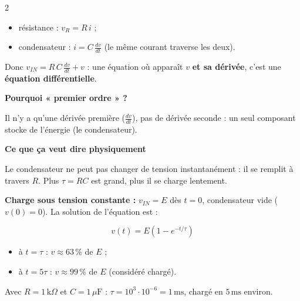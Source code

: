 \documentclass[a4paper,9pt]{extarticle}
\begin{document}
\begin{multicols}{2}
\begin{important}
\begin{itemize}

\item résistance : $v_R = R\,i$ ;

\item condensateur : $i = C\,\frac{dv}{dt}$ (le même courant traverse les deux).

\end{itemize}

Donc $v_{IN} = R\,C\,\frac{dv}{dt} + v$ : une équation où apparaît $v$ \textbf{et sa dérivée}, c'est une \textbf{équation différentielle}.

\vspace{3pt}

\textbf{Pourquoi « premier ordre » ?}

Il n'y a qu'une dérivée première ($\frac{dv}{dt}$), pas de dérivée seconde : un seul composant stocke de l'énergie (le condensateur).

\vspace{3pt}

\textbf{Ce que ça veut dire physiquement}

Le condensateur ne peut pas changer de tension instantanément : il se remplit à travers $R$. Plus $\tau = RC$ est grand, plus il se charge lentement.

\end{important}


\begin{example}

\textbf{Charge sous tension constante :} $v_{IN} = E$ dès $t = 0$, condensateur vide ($v(0) = 0$). La solution de l'équation est :

\[
v(t) = E\left(1 - e^{-t/\tau}\right)
\]

\begin{itemize}

\item à $t = \tau$ : $v \approx 63\,\%$ de $E$ ;

\item à $t = 5\tau$ : $v \approx 99\,\%$ de $E$ (considéré chargé).

\end{itemize}

Avec $R = 1\,\text{k}\Omega$ et $C = 1\,\mu\text{F}$ : $\tau = 10^3 \cdot 10^{-6} = 1\,\text{ms}$, chargé en $5\,\text{ms}$ environ.

\end{example}



\end{multicols}
\end{document}
